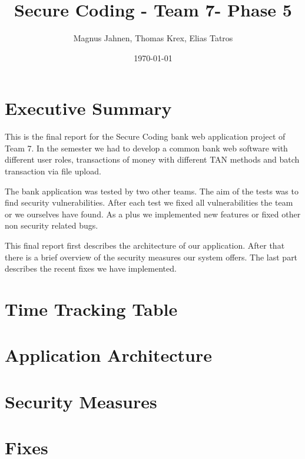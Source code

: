 \documentclass{report}
\title{Secure Coding - Team 7- Phase 5}
\author{Magnus Jahnen, Thomas Krex, Elias Tatros}
\date{\today}
\begin{document}
\maketitle

\part{Executive Summary}

This is the final report for the Secure Coding bank web application project of Team 7. In the semester we had to develop a common bank web software with different user roles, transactions of money with different TAN methods and batch transaction via file upload.

The bank application was tested by two other teams. The aim of the tests was to find security vulnerabilities. After each test we fixed all vulnerabilities the team or we ourselves have found. As a plus we implemented new features or fixed other non security related bugs.

This final report first describes the architecture of our application. After that there is a brief overview of the security measures our system offers. The last part describes the recent fixes we have implemented.

\tableofcontents

\part{Time Tracking Table}



\part{Application Architecture}


\part{Security Measures}



\part{Fixes}







\end{document}
